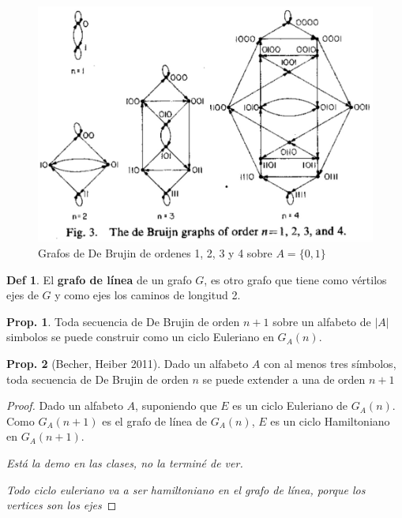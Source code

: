 \documentclass{report}
\theoremstyle{definition} %
\newtheorem{proposition}{Prop.}
\newtheorem*{definition*}{Def}
\begin{document}
\begin{figure}[H]
    \centering
    \includegraphics[scale=0.3]{img/2_de_brujin_ord_1234.png}
    \caption{Grafos de De Brujin de ordenes 1, 2, 3 y 4 sobre $A = \{0, 1\}$}
\end{figure}

\begin{definition*}
    El \textbf{grafo de línea} de un grafo $G$, es otro grafo que tiene como
    vértilos ejes de $G$ y como ejes los caminos de longitud 2.
\end{definition*}


\begin{proposition}
    Toda secuencia de De Brujin de orden $n+1$ sobre un alfabeto de $|A|$
    simbolos se puede construir como un ciclo Euleriano en $G_A(n)$.
\end{proposition}

\begin{proposition}[Becher, Heiber 2011]\label{prop:de-brujin-extend}
    Dado un alfabeto $A$ con al menos tres símbolos, toda secuencia de De
    Brujin de orden $n$ se puede extender a una de orden $n + 1$
\end{proposition}
\begin{proof}
    Dado un alfabeto $A$, suponiendo que $E$ es un ciclo Euleriano de $G_A(n)$.
    Como $G_A(n + 1)$ es el grafo de línea de $G_A(n)$, $E$ es un ciclo
    Hamiltoniano en $G_A(n+1)$.

    \textit{Está la demo en las clases, no la terminé de ver.}

    \textit{Todo ciclo euleriano va a ser hamiltoniano en el grafo de línea, porque los vertices son los ejes}
\end{proof}
\end{document}
